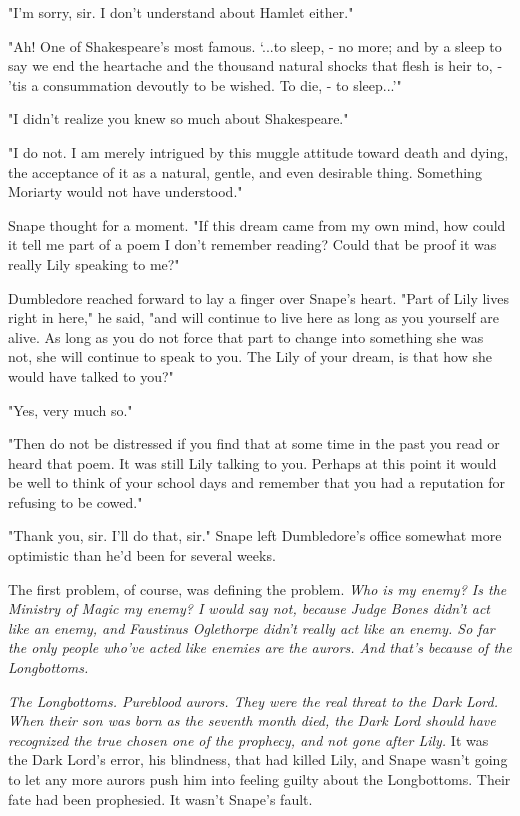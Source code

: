 \documentclass[a4paper,11pt]{article}
\begin{document}
"I'm sorry, sir. I don't understand about Hamlet either."

"Ah! One of Shakespeare's most famous. `...to sleep, - no more; and by a sleep to say we end the heartache and the thousand natural shocks that flesh is heir to, - 'tis a consummation devoutly to be wished. To die, - to sleep...'"

"I didn't realize you knew so much about Shakespeare."

"I do not. I am merely intrigued by this muggle attitude toward death and dying, the acceptance of it as a natural, gentle, and even desirable thing. Something Moriarty would not have understood."

Snape thought for a moment. "If this dream came from my own mind, how could it tell me part of a poem I don't remember reading? Could that be proof it was really Lily speaking to me?"

Dumbledore reached forward to lay a finger over Snape's heart. "Part of Lily lives right in here," he said, "and will continue to live here as long as you yourself are alive. As long as you do not force that part to change into something she was not, she will continue to speak to you. The Lily of your dream, is that how she would have talked to you?"

"Yes, very much so."

"Then do not be distressed if you find that at some time in the past you read or heard that poem. It was still Lily talking to you. Perhaps at this point it would be well to think of your school days and remember that you had a reputation for refusing to be cowed."

"Thank you, sir. I'll do that, sir." Snape left Dumbledore's office somewhat more optimistic than he'd been for several weeks.

The first problem, of course, was defining the problem. \emph{Who is my enemy? Is the Ministry of Magic my enemy? I would say not, because Judge Bones didn't act like an enemy, and Faustinus Oglethorpe didn't really act like an enemy. So far the only people who've acted like enemies are the aurors. And that's because of the Longbottoms.}

\emph{The Longbottoms. Pureblood aurors. They were the real threat to the Dark Lord. When their son was born as the seventh month died, the Dark Lord should have recognized the true chosen one of the prophecy, and not gone after Lily.} It was the Dark Lord's error, his blindness, that had killed Lily, and Snape wasn't going to let any more aurors push him into feeling guilty about the Longbottoms. Their fate had been prophesied. It wasn't Snape's fault.
\end{document}
